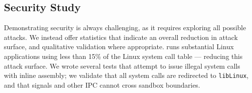 



\subsection{Security Study}

Demonstrating security is always challenging, as it requires exploring all possible attacks.
We instead offer statistics that indicate an overall reduction in attack surface,
and qualitative validation where appropriate.
\sysname{} runs substantial Linux applications using less than 15\% of the
Linux system call table
--- reducing this attack surface.
We wrote several tests that attempt to issue illegal system calls with inline assembly;
we validate that all system calls are redirected to {\tt libLinux},
and that signals and other IPC cannot cross sandbox boundaries.





